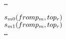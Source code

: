 \newsavebox{\TemplateboxTTwo}
\begin{lrbox}{\TemplateboxTTwo}
\begin{minipage}[t]{0.05\linewidth}
\large
\begin{alltt}
\ldots
\end{alltt}
\end{minipage}
\end{lrbox}

\newsavebox{\TemplateboxTThree}
\begin{lrbox}{\TemplateboxTThree}
\begin{minipage}[t]{0.35\linewidth}
\large
\begin{alltt}
\(s\sb{m0}(from p\sb{m}, to p\sb{r})\)
\(s\sb{m1}(from p\sb{m}, to p\sb{r})\)
\ldots
\end{alltt}
\end{minipage}
\end{lrbox}

\newcommand\examplefigtemplate{
\begin{figure*}[tb]
\begin{center}
\setlength{\tabcolsep}{2pt}
\begin{tabular}[t]{c|c|c|c}
$\mathit{p_r}$ & $\mathit{p_1}$ & $\ldots$ &$\mathit{p_m}$ \\
\hline
\scalebox{0.75}{\usebox{\TemplateboxTZero}}&
\scalebox{0.75}{\usebox{\TemplateboxTOne}} &
\scalebox{0.75}{\usebox{\TemplateboxTTwo}} &
\scalebox{0.75}{\usebox{\TemplateboxTThree}}

\end{tabular}
\end{center}
\caption{A template concurrent trace prorgam.}
\label{fig:Texample}
\end{figure*}
}


